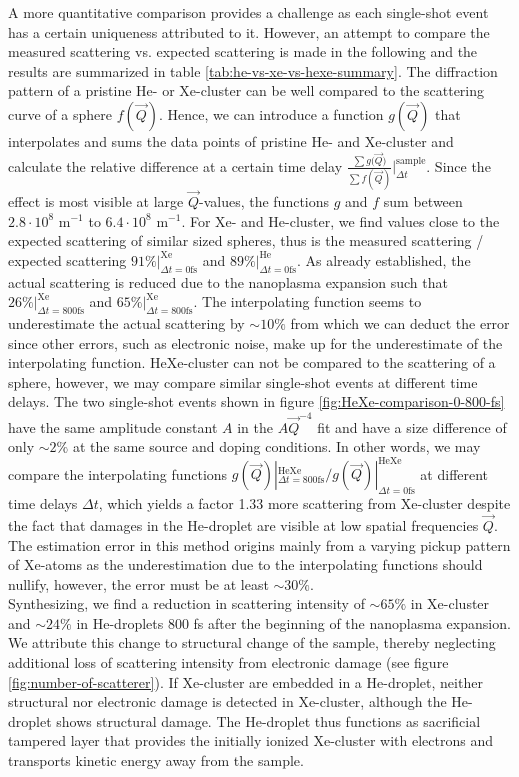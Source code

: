 A more quantitative comparison provides a challenge as each single-shot event has a certain uniqueness attributed to it. However, an attempt to compare the measured scattering vs. expected scattering is made in the following and the results are summarized in table \ref{tab:he-vs-xe-vs-hexe-summary}. The diffraction pattern of a pristine He- or Xe-cluster can be well compared to the scattering curve of a sphere $f(\vec{Q})$. Hence, we can introduce a function $g(\vec{Q})$ that interpolates and sums the data points of pristine He- and Xe-cluster and calculate the relative difference at a certain time delay $\tfrac{\sum{g(\vec{Q}})}{\sum{f(\vec{Q})}}|_{\Delta t}^{\text{sample}}$. Since the effect is most visible at large $\vec{Q}$-values, the functions $g$ and $f$ sum between $2.8\cdot 10^{8}$ m$^{-1}$ to $6.4\cdot 10^{8}$ m$^{-1}$. For Xe- and He-cluster, we find values close to the expected scattering of similar sized spheres, thus is the measured scattering / expected scattering $91 \% |_{\Delta t = 0 \text{fs}}^{\text{Xe}}$ and $89 \%|_{\Delta t=0 \text{fs}}^{\text{He}}$. As already established, the actual scattering is reduced due to the nanoplasma expansion such that $26 \% |_{\Delta t = 800 \text{fs}}^{\text{Xe}}$ and $65 \% |_{\Delta t = 800 \text{fs}}^{\text{Xe}}$. The interpolating function seems to underestimate the actual scattering by $\sim 10\%$ from which we can deduct the error since other errors, such as electronic noise, make up for the underestimate of the interpolating function. HeXe-cluster can not be compared to the scattering of a sphere, however, we may compare similar single-shot events at different time delays. The two single-shot events shown in figure \ref{fig:HeXe-comparison-0-800-fs} have the same amplitude constant $A$ in the $A \vec{Q}^{-4}$ fit and have a size difference of only $\sim 2\%$ at the same source and doping conditions. In other words, we may compare the interpolating functions $g(\vec{Q}) |_{\Delta t = 800 \text{fs}}^{\text{HeXe}}/g(\vec{Q}) |_{\Delta t = 0 \text{fs}}^{\text{HeXe}}$ at different time delays $\Delta t$, which yields a factor 1.33 more scattering from Xe-cluster despite the fact that damages in the He-droplet are visible at low spatial frequencies $\vec{Q}$. The estimation error in this method origins mainly from a varying pickup pattern of Xe-atoms as the underestimation due to the interpolating functions should nullify, however, the error must be at least $\sim 30 \%$.\\
Synthesizing, we find a reduction in scattering intensity of $\sim 65 \%$ in Xe-cluster and $\sim 24 \%$ in He-droplets 800 fs after the beginning of the nanoplasma expansion. We attribute this change to structural change of the sample, thereby neglecting additional loss of scattering intensity from electronic damage (see figure \ref{fig:number-of-scatterer}). If Xe-cluster are embedded in a He-droplet, neither structural nor electronic damage is detected in Xe-cluster, although the He-droplet shows structural damage. The He-droplet thus functions as sacrificial tampered layer that provides the initially ionized Xe-cluster with electrons and transports kinetic energy away from the sample.
